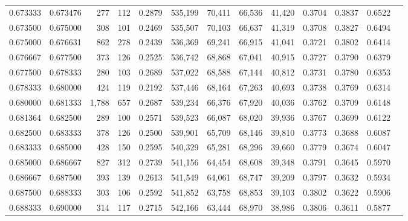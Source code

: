 \begin{tabular}{rrrrrrrrrrrrr}
0.673333 & 0.673476 &   277 & 112 &                                     0.2879 & 535,199 &  70,411 &  66,536 &  41,420 & 0.3704 & 0.3837 & 0.6522 \\
0.673500 & 0.675000 &   308 & 101 &                                     0.2469 & 535,507 &  70,103 &  66,637 &  41,319 & 0.3708 & 0.3827 & 0.6494 \\
0.675000 & 0.676631 &   862 & 278 &                                     0.2439 & 536,369 &  69,241 &  66,915 &  41,041 & 0.3721 & 0.3802 & 0.6414 \\
0.676667 & 0.677500 &   373 & 126 &                                     0.2525 & 536,742 &  68,868 &  67,041 &  40,915 & 0.3727 & 0.3790 & 0.6379 \\
0.677500 & 0.678333 &   280 & 103 &                                     0.2689 & 537,022 &  68,588 &  67,144 &  40,812 & 0.3731 & 0.3780 & 0.6353 \\
0.678333 & 0.680000 &   424 & 119 &                                     0.2192 & 537,446 &  68,164 &  67,263 &  40,693 & 0.3738 & 0.3769 & 0.6314 \\
0.680000 & 0.681333 & 1,788 & 657 &                                     0.2687 & 539,234 &  66,376 &  67,920 &  40,036 & 0.3762 & 0.3709 & 0.6148 \\
0.681364 & 0.682500 &   289 & 100 &                                     0.2571 & 539,523 &  66,087 &  68,020 &  39,936 & 0.3767 & 0.3699 & 0.6122 \\
0.682500 & 0.683333 &   378 & 126 &                                     0.2500 & 539,901 &  65,709 &  68,146 &  39,810 & 0.3773 & 0.3688 & 0.6087 \\
0.683333 & 0.685000 &   428 & 150 &                                     0.2595 & 540,329 &  65,281 &  68,296 &  39,660 & 0.3779 & 0.3674 & 0.6047 \\
0.685000 & 0.686667 &   827 & 312 &                                     0.2739 & 541,156 &  64,454 &  68,608 &  39,348 & 0.3791 & 0.3645 & 0.5970 \\
0.686667 & 0.687500 &   393 & 139 &                                     0.2613 & 541,549 &  64,061 &  68,747 &  39,209 & 0.3797 & 0.3632 & 0.5934 \\
0.687500 & 0.688333 &   303 & 106 &                                     0.2592 & 541,852 &  63,758 &  68,853 &  39,103 & 0.3802 & 0.3622 & 0.5906 \\
0.688333 & 0.690000 &   314 & 117 &                                     0.2715 & 542,166 &  63,444 &  68,970 &  38,986 & 0.3806 & 0.3611 & 0.5877 \\

\end{tabular}
